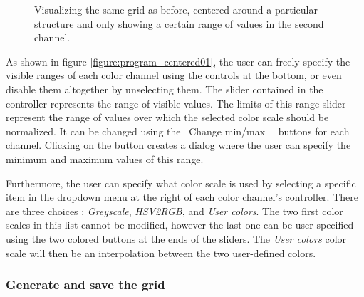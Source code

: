 {{\begin{figure}[h]
			\caption{Visualizing the same grid as before, centered around a particular structure and only showing a certain range of values in the second channel.}
		\end{figure}
		As shown in figure \ref{figure:program_centered01}, the user can freely specify the visible ranges of each color channel using the controls at the bottom, or even disable them altogether by unselecting them. The slider contained in the controller represents the range of visible values. The limits of this range slider represent the range of values over which the selected color scale should be normalized. It can be changed using the \guillemotleft{}~Change min/max~\guillemotright{}~ buttons for each channel. Clicking on the button creates a dialog where the user can specify the minimum and maximum values of this range.\par
		Furthermore, the user can specify what color scale is used by selecting a specific item in the dropdown menu at the right of each color channel's controller. There are three choices : \textit{Greyscale}, \textit{HSV2RGB}, and \textit{User colors}. The two first color scales in this list cannot be modified, however the last one can be user-specified using the two colored buttons at the ends of the sliders. The \textit{User colors} color scale will then be an interpolation between the two user-defined colors.
	}

	\subsubsection{Generate and save the grid}
	{
	}

}

